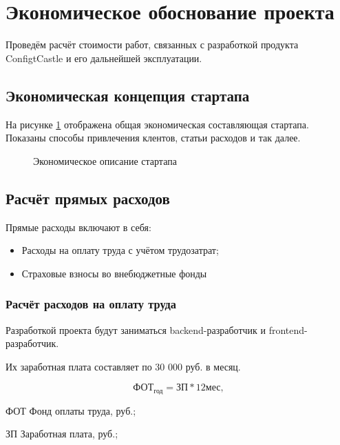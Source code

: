 \section{Экономическое обоснование проекта}

Проведём расчёт стоимости работ, связанных с разработкой
продукта ConfigtCastle и его дальнейшей эксплуатации.

\tocless\subsection{Экономическая концепция стартапа}

На рисунке \ref{ec:canvas} отображена общая экономическая составляющая стартапа.
Показаны способы привлечения клентов, статьи расходов и так далее.

\begin{figure}[H]
    \caption{Экономическое описание стартапа}
    \label{ec:canvas}
\end{figure}

\tocless\subsection{Расчёт прямых расходов}

Прямые расходы включают в себя:
\begin{itemize}
    \item Расходы на оплату труда с учётом трудозатрат;
    \item Страховые взносы во внебюджетные фонды
\end{itemize}

\subsubsection{Расчёт расходов на оплату труда}

Разработкой проекта будут заниматься backend-разработчик и
frontend-разработчик.

Их заработная плата составляет по 30 000 руб. в месяц.

\begin{equation}
   \text{ФОТ}_\text{год} = \text{ЗП} * 12 \text{мес},
\end{equation}

\begin{eqexpl}[25mm]
    \item{ФОТ} Фонд оплаты труда, руб.;
    \item{ЗП} Заработная плата, руб.;
\end{eqexpl}

